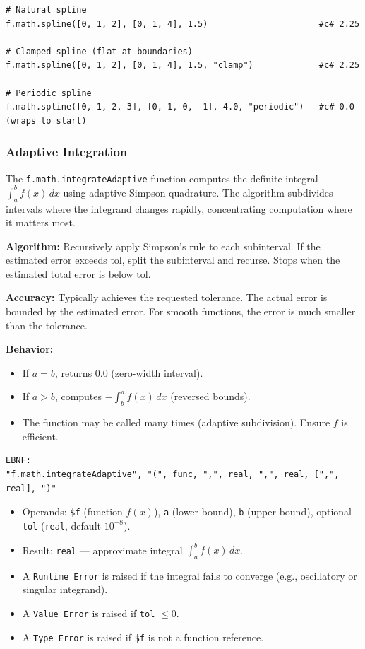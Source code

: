 \begin{verbatim}
# Natural spline
f.math.spline([0, 1, 2], [0, 1, 4], 1.5)                      #c# 2.25

# Clamped spline (flat at boundaries)
f.math.spline([0, 1, 2], [0, 1, 4], 1.5, "clamp")             #c# 2.25

# Periodic spline
f.math.spline([0, 1, 2, 3], [0, 1, 0, -1], 4.0, "periodic")   #c# 0.0 (wraps to start)
\end{verbatim}

\subsubsection{Adaptive Integration}
The \texttt{f.math.integrateAdaptive} function computes the definite integral $\int_a^b f(x)\,dx$ using adaptive Simpson quadrature. The algorithm subdivides intervals where the integrand changes rapidly, concentrating computation where it matters most.

\textbf{Algorithm:} Recursively apply Simpson's rule to each subinterval. If the estimated error exceeds $\text{tol}$, split the subinterval and recurse. Stops when the estimated total error is below $\text{tol}$.

\textbf{Accuracy:} Typically achieves the requested tolerance. The actual error is bounded by the estimated error. For smooth functions, the error is much smaller than the tolerance.

\textbf{Behavior:}
\begin{itemize}
\item If $a = b$, returns 0.0 (zero-width interval).
\item If $a > b$, computes $-\int_b^a f(x)\,dx$ (reversed bounds).
\item The function may be called many times (adaptive subdivision). Ensure $f$ is efficient.
\end{itemize}

\begin{verbatim}
EBNF:
"f.math.integrateAdaptive", "(", func, ",", real, ",", real, [",", real], ")"
\end{verbatim}
\begin{itemize}
\item Operands: \texttt{\$f} (function $f(x)$), \texttt{a} (lower bound), \texttt{b} (upper bound), optional \texttt{tol} (\texttt{real}, default $10^{-8}$).
\item Result: \texttt{real} --- approximate integral $\int_a^b f(x)\,dx$.
\item A \texttt{Runtime Error} is raised if the integral fails to converge (e.g., oscillatory or singular integrand).
\item A \texttt{Value Error} is raised if \texttt{tol} $\leq 0$.
\item A \texttt{Type Error} is raised if \texttt{\$f} is not a function reference.
\end{itemize}

